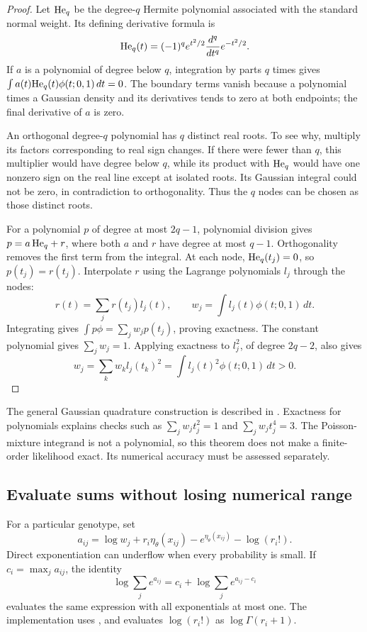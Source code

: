 \begin{proof}
Let \({\rm He}_q\) be the degree-\(q\) Hermite polynomial associated with the
standard normal weight. Its defining derivative formula is
\[
 {\rm He}_q(t)=(-1)^q e^{t^2/2}
             \frac{d^q}{dt^q}e^{-t^2/2}.
\]
If \(a\) is a polynomial of degree below \(q\), integration by parts \(q\)
times gives \(\int a(t){\rm He}_q(t)\phi(t;0,1)\,dt=0\). The boundary
terms vanish because a polynomial times a Gaussian density and its
derivatives tends to zero at both endpoints; the final derivative of \(a\)
is zero.

An orthogonal degree-\(q\) polynomial has \(q\) distinct real roots. To see
why, multiply its factors corresponding to real sign changes. If there were
fewer than \(q\), this multiplier would have degree below \(q\), while its
product with \({\rm He}_q\) would have one nonzero sign on the real line
except at isolated roots. Its Gaussian integral could not be zero, in
contradiction to orthogonality. Thus the \(q\) nodes can be chosen as those
distinct roots.

For a polynomial \(p\) of degree at most \(2q-1\), polynomial division gives
\(p=a\,{\rm He}_q+r\), where both \(a\) and \(r\) have degree at most
\(q-1\). Orthogonality removes the first term from the integral. At each
node, \({\rm He}_q(t_j)=0\), so \(p(t_j)=r(t_j)\). Interpolate \(r\) using
the Lagrange polynomials \(l_j\) through the nodes:
\[
 r(t)=\sum_jr(t_j)l_j(t),\qquad
 w_j=\int l_j(t)\phi(t;0,1)\,dt.
\]
Integrating gives \(\int p\phi=\sum_jw_jp(t_j)\), proving exactness.
The constant polynomial gives \(\sum_jw_j=1\). Applying exactness to
\(l_j^2\), of degree \(2q-2\), also gives
\[
 w_j=\sum_kw_k l_j(t_k)^2
     =\int l_j(t)^2\phi(t;0,1)\,dt>0.
\]
\end{proof}

The general Gaussian quadrature construction is described in
\citet{NISTDLMF}. Exactness for polynomials explains checks such as
\(\sum_jw_jt_j^2=1\) and \(\sum_jw_jt_j^4=3\). The Poisson-mixture integrand
is not a polynomial, so this theorem does not make a finite-order likelihood
exact. Its numerical accuracy must be assessed separately.

\subsection{Evaluate sums without losing numerical range}

For a particular genotype, set
\[
 a_{ij}=\log w_j+r_i\eta_\theta(x_{ij})
          -e^{\eta_\theta(x_{ij})}-\log(r_i!).
\]
Direct exponentiation can underflow when every probability is small. If
\(c_i=\max_j a_{ij}\), the identity
\begin{equation}
 \log\sum_j e^{a_{ij}}
 =c_i+\log\sum_j e^{a_{ij}-c_i}
 \label{estimation:logsumexp}
\end{equation}
evaluates the same expression with all exponentials at most one. The
implementation uses , and evaluates
\(\log(r_i!)\) as \(\log\Gamma(r_i+1)\).

